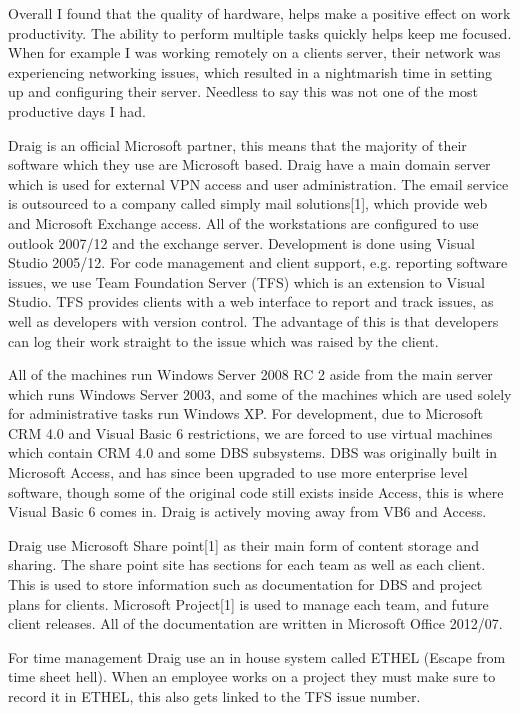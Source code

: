 \documentclass[paper=a4, fontsize=11pt]{scrartcl}	%
\begin{document}
Overall I found that the quality of hardware, helps make a positive effect on work productivity. The ability to perform multiple tasks quickly helps keep me focused. When for example I was working remotely on a clients server, their network was experiencing networking issues, which resulted in a nightmarish time in setting up and configuring their server. Needless to say this was not one of the most productive days I had. 

Draig is an official Microsoft partner, this means that the majority of their software which they use are Microsoft based. Draig have a main domain server which is used for external VPN access and user administration. The email service is outsourced to a company called simply mail solutions[1], which provide web and Microsoft Exchange access. All of the workstations are configured to use outlook 2007/12 and the exchange server. Development is done using Visual Studio 2005/12. For code management and client support, e.g. reporting software issues, we use Team Foundation Server (TFS) which is an extension to Visual Studio. TFS provides clients with a web interface to report and track issues, as well as developers with version control. The advantage of this is that developers can log their work straight to the issue which was raised by the client. 

All of the machines run Windows Server 2008 RC 2 aside from the main server which runs Windows Server 2003, and some of the machines which are used solely for administrative tasks  run Windows XP. For development, due to Microsoft CRM 4.0 and Visual Basic 6 restrictions, we are forced to use virtual machines which contain CRM 4.0 and some DBS subsystems. DBS was originally built in Microsoft Access, and has since been upgraded to use more enterprise level software, though some of the original code still exists inside Access, this is where Visual Basic 6 comes in. Draig is actively moving away from VB6 and Access.

Draig use Microsoft Share point[1] as their main form of content storage and sharing. The share point site has sections for each team as well as each client.  This is used to store information such as documentation for DBS and project plans for clients. Microsoft Project[1] is used to manage each team, and future client releases. All of the documentation are written in Microsoft Office 2012/07.

For time management Draig use an in house system called ETHEL (Escape from time sheet hell).   When an employee works on a project they must make sure to record it in ETHEL, this also gets linked to the TFS issue number.
\end{document}
